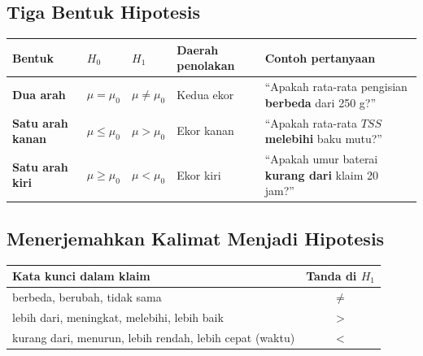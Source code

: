 \documentclass[
  indonesian,
  letterpaper,
]{book}
\newcounter{none} %
\begin{document}
\subsection{Tiga Bentuk Hipotesis}\label{tiga-bentuk-hipotesis}

{\def\LTcaptype{none} %
\begin{longtable}[]{@{}
  >{\raggedright\arraybackslash}p{}
  >{\raggedright\arraybackslash}p{}
  >{\raggedright\arraybackslash}p{}
  >{\raggedright\arraybackslash}p{}
  >{\raggedright\arraybackslash}p{}@{}}
\toprule\noalign{}
\begin{minipage}[b]{\linewidth}\raggedright
Bentuk
\end{minipage} & \begin{minipage}[b]{\linewidth}\raggedright
\(H_0\)
\end{minipage} & \begin{minipage}[b]{\linewidth}\raggedright
\(H_1\)
\end{minipage} & \begin{minipage}[b]{\linewidth}\raggedright
Daerah penolakan
\end{minipage} & \begin{minipage}[b]{\linewidth}\raggedright
Contoh pertanyaan
\end{minipage} \\
\midrule\noalign{}
\endhead
\bottomrule\noalign{}
\endlastfoot
\textbf{Dua arah} & \(\mu = \mu_0\) & \(\mu \ne \mu_0\) & Kedua ekor &
``Apakah rata-rata pengisian \textbf{berbeda} dari 250 g?'' \\
\textbf{Satu arah kanan} & \(\mu \le \mu_0\) & \(\mu > \mu_0\) & Ekor
kanan & ``Apakah rata-rata \(TSS\) \textbf{melebihi} baku mutu?'' \\
\textbf{Satu arah kiri} & \(\mu \ge \mu_0\) & \(\mu < \mu_0\) & Ekor
kiri & ``Apakah umur baterai \textbf{kurang dari} klaim 20 jam?'' \\
\end{longtable}
}

\subsection{Menerjemahkan Kalimat Menjadi
Hipotesis}\label{menerjemahkan-kalimat-menjadi-hipotesis}

{\def\LTcaptype{none} %
\begin{longtable}[]{@{}lc@{}}
\toprule\noalign{}
Kata kunci dalam klaim & Tanda di \(H_1\) \\
\midrule\noalign{}
\endhead
\bottomrule\noalign{}
\endlastfoot
berbeda, berubah, tidak sama & \(\ne\) \\
lebih dari, meningkat, melebihi, lebih baik & \(>\) \\
kurang dari, menurun, lebih rendah, lebih cepat (waktu) & \(<\) \\
\end{longtable}
}
\end{document}
